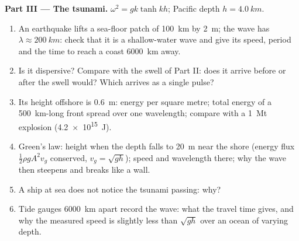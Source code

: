 \begin{problem}
\medskip
\noindent\textbf{Part III --- The tsunami.}
$\omega^2 = gk\tanh kh$; Pacific depth $h = \qty{4.0}{km}$.
\begin{enumerate}[resume]
  \item An earthquake lifts a sea-floor patch of \qty{100}{km} by
        \qty{2}{m}; the wave has $\lambda \approx \qty{200}{km}$: check that it is a
        shallow-water wave and give its speed, period and the time to
        reach a coast \qty{6000}{km} away.
  \item Is it dispersive? Compare with the swell of Part II: does it
        arrive before or after the swell would? Which arrives as a
        single pulse?
  \item Its height offshore is \qty{0.6}{m}: energy per square metre;
        total energy of a \qty{500}{km}-long front spread over one
        wavelength; compare with a \qty{1}{Mt} explosion (\qty{4.2e15}{J}).
  \item Green's law: height when the depth falls to \qty{20}{m} near the
        shore (energy flux $\tfrac12\rho gA^2v_g$ conserved, $v_g = \sqrt{gh}$);
        speed and wavelength there; why the wave then steepens and
        breaks like a wall.
  \item A ship at sea does not notice the tsunami passing: why?
  \item Tide gauges \qty{6000}{km} apart record the wave: what the
        travel time gives, and why the measured speed is slightly
        less than $\sqrt{gh}$ over an ocean of varying depth.
\end{enumerate}


\end{problem}

